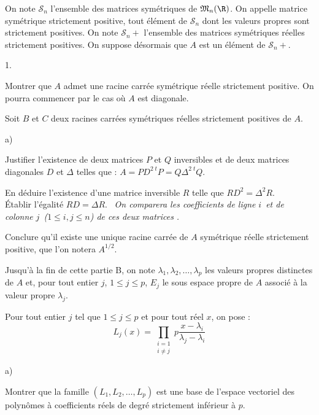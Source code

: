 \documentclass[11pt]{article}%
\begin{document}
On note $\mathcal{S}_{n}$ l'ensemble des matrices symétriques de
$\mathfrak{M}_{n}(\R)$. On appelle matrice symétrique strictement
positive, tout 
élément de $\mathcal{S}_{n}$ dont les valeurs propres sont strictement
positives. On note $\mathcal{S}_{n}{+}$ l'ensemble des matrices
symétriques
réelles strictement positives. On suppose désormais que $A$ est un
élément
de $\mathcal{S}_{n}{+}$.

\begin{noliste}{1.}
 \setlength{\itemsep}{4mm}
\item Montrer que $A$ admet une racine carrée symétrique réelle
strictement
positive. On pourra commencer par le cas où $A$ est diagonale.

\item Soit $B$ et $C$ deux racines carrées symétriques réelles
strictement
positives de $A$.

\begin{noliste}{a)}
 \setlength{\itemsep}{2mm}
\item Justifier l'existence de deux matrices $P$ et $Q$ inversibles et
de
deux matrices diagonales $D$ et $\Delta $ telles que : $A = PD^{2\;t}P
= Q\Delta
^{2\;t}Q$.

\item En déduire l'existence d'une matrice inversible $R$ telle que
$RD^{2} = \Delta ^{2}R$.\\
Établir l'égalité $RD = \Delta R$. \ \textit{On comparera les
coefficients de
ligne }$i$\textit{\ et de colonne }$j$\textit{\ (}$1\leq i,j\leq
n$\textit{) de ces deux matrices} \emph{.}

\item Conclure qu'il existe une unique racine carrée de $A$ symétrique
réelle strictement positive, que l'on notera $A^{1/2}$.\vspace{0.5cm}
\end{noliste}

Jusqu'à la fin de cette partie B, on note
$\lambda_{1},\lambda_{2},\ldots,\lambda_{p}$ les valeurs propres
distinctes de $A$ et, pour tout entier $j$, $1\leq j\leq p$, $E_{j}$ le
sous espace propre de $A$ associé à
la valeur propre $\lambda_{j}$.

\item Pour tout entier $j$ tel que $1\leq j\leq p$ et pour tout réel
$x$, on pose : 
\[
L_{j}(x) = \prod_{\substack{ i = 1 \\
i\neq j}}{p}\dfrac{x-\lambda_{i}}{\lambda_{j}-\lambda_{i}}
\]

\begin{noliste}{a)}
 \setlength{\itemsep}{2mm}
\item Montrer que la famille $(L_{1},L_{2},\ldots,L_{p})$ est une base
de
l'espace vectoriel des polynômes à coefficients réels de degré
strictement
inférieur à $p$.


\end{noliste}
\end{noliste}
\end{document}
